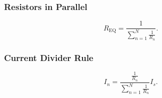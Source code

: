 \subsubsection{Resistors in Parallel}
\begin{equation*}
  R_{\mathrm{EQ}} = \frac{1}{\sum_{n = 1}^{N} \frac{1}{R_n}}
.\end{equation*}

\begin{symbols}
\end{symbols}

\subsubsection{Current Divider Rule}
\begin{equation*}
  I_n = \frac{\frac{1}{R_n}}{\sum_{n = 1}^{N} \frac{1}{R_n}} I_s
.\end{equation*}

\begin{symbols}
\end{symbols}

